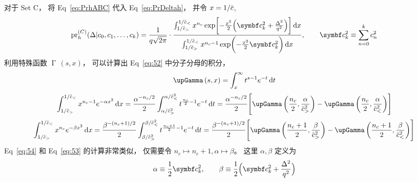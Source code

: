 对于 Set C，
将 Eq~\eqref{eq:PrhABC} 代入 Eq~\eqref{eq:PrDeltah}，
并令 $x=1/\dmscbar$,
\begin{equation}
  \label{eq:52}
  \dmspr_h^{(C)}(\Delta|\dmsccck) = \frac{1}{q\sqrt{2\pi}}\cdot\frac{
    \int_{1/\dmscbar_>}^{1/\dmscbar_<}x^{n_c}\exp\biggl[- \frac{x^2}{2}\Bigl(
    \dmsccckb^2+\frac{\Delta^2}{q^2}\Bigr)\biggr]\dmsdif x}{
    \int_{1/\dmscbar_>}^{1/\dmscbar_<}x^{n_c-1}\exp\biggl(- \frac{
      x^2}{2}\dmsccckb^2\biggr)\dmsdif x},
  \qquad \dmsccckb^2\equiv\sum_{n=0}^k c_n^2
\end{equation}
利用特殊函数 $\upGamma\,(s,x)$，
可以计算出 Eq~\eqref{eq:52} 中分子分母的积分，
\begin{equation}
  \label{eq:upGammasx}
  \upGamma\,(s,x) = \int_x^\infty t^{s-1}e^{-t}\dmsdif t
\end{equation}
\begin{equation}
  \label{eq:53}
  \int_{1/\dmscbar_>}^{1/\dmscbar_<}x^{n_c-1}e^{-\alpha x^2}\dmsdif x
  = \frac{\alpha^{-n_c/2}}{2}
  \int_{\alpha/\dmscbar_>^2}^{\alpha/\dmscbar_<^2}
    t^{ \frac{n_c}{2}-1}e^{-t}\dmsdif t
  = \frac{\alpha^{-n_c/2}}{2}
  \Biggl[\upGamma\,\biggl( \frac{n_c}{2},
    \frac{\alpha}{\dmscbar_>^2}\biggr)
      - \upGamma\,\biggl( \frac{n_c}{2},
      \frac{\alpha}{\dmscbar_<^2}\biggr)\Biggr]
\end{equation}
\begin{equation}
  \label{eq:54}
  \int_{1/\dmscbar_>}^{1/\dmscbar_<}x^{n_c}e^{-\beta x^2}\dmsdif x
  = \frac{\beta^{-(n_c+1)/2}}{2}
  \int_{\beta/\dmscbar_>^2}^{\beta/\dmscbar_<^2}
    t^{ \frac{n_c+1}{2}-1}e^{-t}\dmsdif t
  = \frac{\beta^{-(n_c+1)/2}}{2}
  \Biggl[\upGamma\,\biggl( \frac{n_c+1}{2},
    \frac{\beta}{\dmscbar_>^2}\biggr)
      - \upGamma\,\biggl( \frac{n_c+1}{2},
      \frac{\beta}{\dmscbar_<^2}\biggr)\Biggr]
\end{equation}
Eq~\eqref{eq:54} 和 Eq~\eqref{eq:53} 的计算非常类似，
仅需要令 $n_c\mapsto n_c+1, \alpha\mapsto\beta$。
这里 $\alpha,\beta$ 定义为
\begin{equation}
  \alpha\equiv \frac{1}{2}\dmsccckb^2,
  \qquad
  \beta\equiv \frac{1}{2}\Bigl(\dmsccckb^2+ \frac{\Delta^2}{q^2}
  \Bigr)
\end{equation}

